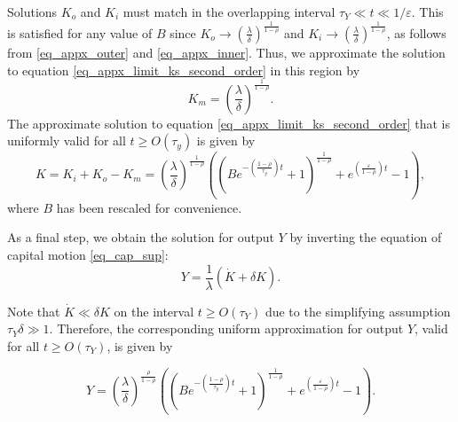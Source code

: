 Solutions $K_o$ and $K_i$ must match in the overlapping interval $\tau_Y\ll t\ll1/\varepsilon$. This is satisfied for any value of $B$ since $K_o\rightarrow\left(\frac{\lambda}{\delta}\right)^{\frac{1}{1-\rho}}$ 
and $K_i\rightarrow\left(\frac{\lambda}{\delta}\right)^{\frac{1}{1-\rho}}$, as follows from \eqref{eq_appx_outer} and \eqref{eq_appx_inner}. Thus, we approximate the solution to equation \eqref{eq_appx_limit_ks_second_order} in this region by
\begin{equation}
K_m = \left(\frac{\lambda}{\delta}\right)^{\frac{1}{1-\rho}}.
\end{equation}
The approximate solution to equation \eqref{eq_appx_limit_ks_second_order} that is uniformly valid for all $t\geq O(\tau_y)$ is given by
\begin{equation}\label{eq_appx_cap_sol}
    K = K_i+K_o-K_m = \left(\frac{\lambda}{\delta}\right)^{\frac{1}{1-\rho}}\left(\left(Be^{-\left(\frac{1-\rho}{\tau_y}\right)t}+1\right)^{\frac{1}{1-\rho}}+e^{\left(\frac{\varepsilon}{1-\rho}\right)t}-1\right),
\end{equation}
where $B$ has been rescaled for convenience.

As a final step, we obtain the solution for output $Y$ by inverting the equation of capital motion \eqref{eq_cap_sup}:
\begin{equation}
	Y = \frac{1}{\lambda}\left(\dot{K}+\delta K\right).
\end{equation}

Note that $\dot{K}\ll\delta K$ on the interval $t\geq O(\tau_Y)$ due to the simplifying assumption $\tau_Y\delta\gg1$. Therefore, the corresponding uniform approximation for output $Y$, valid for all $t\geq O(\tau_Y)$, is given by

\begin{equation}\label{eq_appx_prod_sol}
    Y = \left(\frac{\lambda}{\delta}\right)^{\frac{\rho}{1-\rho}}\left(\left(Be^{-\left(\frac{1-\rho}{\tau_y}\right)t}+1\right)^{\frac{1}{1-\rho}}+e^{\left(\frac{\varepsilon}{1-\rho}\right)t}-1\right).
\end{equation}
